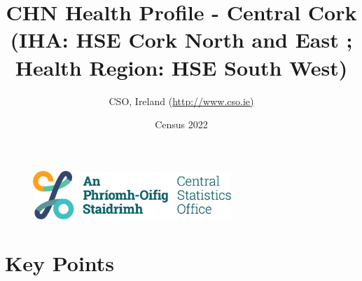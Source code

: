 \documentclass{article}
\title{CHN Health Profile - Central Cork (IHA: HSE Cork North and East ;  Health Region: HSE South West) }
\date{Census 2022}
\author{CSO, Ireland  (\url{http://www.cso.ie)}}
\begin{document}


\begin{figure}
	\centering
\includegraphics[width =75mm]{../figures/CSO_Logo.png}
\end{figure}

				 
		   
						  
														  
																																													
												 
			 
\maketitle
					
													   
				 
						 
																																																																											   
				 
				  
  \pagebreak
    	    \tableofcontents

\pagebreak


\section{Key Points}
\end{document}
